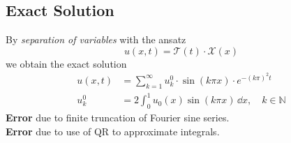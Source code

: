 \subsection{Exact Solution}
    By \textit{separation of variables} with the ansatz 
    $$u(x,t) = \mathcal{T}(t) \cdot \mathcal{X}(x)$$
    we obtain the exact solution
    \begin{align*}
        u(x,t) &= \sum\limits_{k=1}^{\infty} u_k^0  \cdot \sin(k\pi x) \cdot e^{-(k\pi)^2 t}\\
        u_k^0 &= 2  \int_0^1 u_0(x) \sin(k\pi x)\, \dd x,\quad k \in \mathbb{N}
    \end{align*}
    \textbf{Error} due to finite truncation of Fourier sine series.\\
    \textbf{Error} due to use of QR to approximate integrals.
    